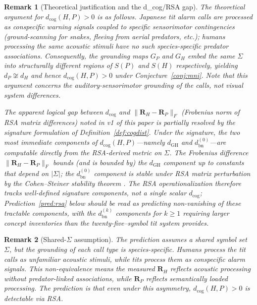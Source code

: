 \documentclass[12pt]{article}
\newtheorem{remark}{Remark}
\begin{document}
\begin{remark}[Theoretical justification and the d\_cog/RSA gap]
\label{rem:pred}
The theoretical argument for $d_\mathrm{cog}(H,P) > 0$ is as follows.
Japanese tit alarm calls are processed as conspecific warning signals
coupled to specific sensorimotor contingencies
(ground-scanning for snakes, fleeing from aerial predators, etc.);
humans processing the same acoustic stimuli have no such
species-specific predator associations.
Consequently, the grounding maps $G_P$ and $G_H$
embed the same $\Sigma$ into structurally different regions
of $S(P)$ and $S(H)$ respectively,
yielding $d_P \not\cong d_H$ and hence $d_\mathrm{cog}(H,P) > 0$
under Conjecture~\ref{conj:mni}.
Note that this argument concerns the \emph{auditory-sensorimotor}
grounding of the calls, not visual system differences.

The apparent logical gap between $d_\mathrm{cog}$ and
$\|\mathbf{R}_H - \mathbf{R}_P\|_F$ (Frobenius norm of RSA matrix
differences) noted in v1 of this paper is partially resolved by the
signature formulation of Definition~\ref{def:cogdist}. Under the
signature, the two most immediate components of
$d_\mathrm{cog}(H, P)$---namely $d_\mathrm{GH}$ and
$d_\mathrm{bn}^{(0)}$---are computable directly from the RSA-derived
metric on $\Sigma$. The Frobenius difference
$\|\mathbf{R}_H - \mathbf{R}_P\|_F$ bounds (and is bounded by) the
$d_\mathrm{GH}$ component up to constants that depend on $|\Sigma|$;
the $d_\mathrm{bn}^{(0)}$ component is stable under RSA matrix
perturbation by the Cohen--Steiner stability theorem
\cite{cohenSteiner2007}. The RSA operationalization therefore tracks
well-defined signature components, not a single scalar
$d_\mathrm{cog}$; Prediction~\ref{pred:rsa} below should be read as
predicting non-vanishing of these tractable components, with the
$d_\mathrm{bn}^{(k)}$ components for $k \geq 1$ requiring larger
concept inventories than the twenty-five--symbol tit system
provides.
\end{remark}

\begin{remark}[Shared-$\Sigma$ assumption]
The prediction assumes a shared symbol set $\Sigma$,
but the grounding of each call type is species-specific.
Humans process the tit calls as unfamiliar acoustic stimuli,
while tits process them as conspecific alarm signals.
This non-equivalence means the measured $\mathbf{R}_H$
reflects acoustic processing without predator-linked associations,
while $\mathbf{R}_P$ reflects semantically loaded processing.
The prediction is that even under this asymmetry,
$d_\mathrm{cog}(H,P) > 0$ is detectable via RSA.
\end{remark}
\end{document}
